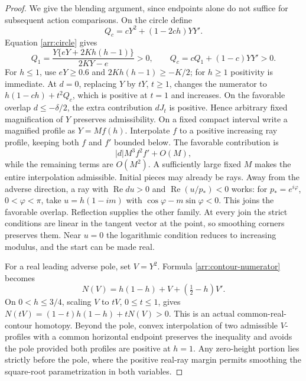 \begin{proof}
We give the blending argument, since endpoints alone do not suffice
for subsequent action comparisons.  On the circle define
\[
 Q_c=cY^2+(1-2ch)YY'.
\]
Equation \eqref{arr:circle} gives
\[
 Q_1=\frac{Y\{eY+2Kh(h-1)\}}{2KY-e}>0,\qquad
 Q_c=cQ_1+(1-c)YY'>0.
\]
For \(h\le1\), use \(eY\ge0.6\) and
\(2Kh(h-1)\ge-K/2\); for \(h\ge1\) positivity is immediate.
At \(d=0\), replacing \(Y\) by \(tY\), \(t\ge1\), changes the numerator
to \(h(1-ch)+t^2Q_c\), which is positive at \(t=1\) and increases.
On the favorable overlap \(d\le-\delta/2\), the extra contribution
\(dJ_t\) is positive.  Hence arbitrary fixed magnification of \(Y\)
preserves admissibility.
On a fixed compact interval write a magnified profile as \(Y=Mf(h)\).
Interpolate \(f\) to a positive increasing ray profile, keeping both
\(f\) and \(f'\) bounded below.  The favorable contribution is
\[
 |d|M^3f^2f'+O(M),
\]
while the remaining terms are \(O(M^2)\).  A sufficiently large
fixed \(M\) makes the entire interpolation admissible.  Initial
pieces may already be rays.  Away from the adverse direction, a ray
with \(\operatorname{Re}du>0\) and
\(\operatorname{Re}(u/p_*)<0\) works: for
\(p_*=e^{i\varphi}\), \(0<\varphi<\pi\), take
\(u=h(1-im)\) with \(\cos\varphi-m\sin\varphi<0\).
This joins the favorable overlap.  Reflection supplies the other
family.  At every join the strict conditions are linear in the
tangent vector at the point, so smoothing corners preserves them.
Near \(u=0\) the logarithmic condition reduces to increasing modulus,
and the start can be made real.

For a real leading adverse pole, set \(V=Y^2\).  Formula
\eqref{arr:contour-numerator} becomes
\begin{equation}\label{arr:affine-homotopy}
 N(V)=h(1-h)+V+(\tfrac12-h)V'.
\end{equation}
On \(0<h\le3/4\), scaling \(V\) to \(tV\), \(0\le t\le1\), gives
\(N(tV)=(1-t)h(1-h)+tN(V)>0\).
This is an actual common-real-contour homotopy.  Beyond the pole,
convex interpolation of two admissible \(V\)-profiles with a common
horizontal endpoint preserves the inequality and avoids the pole
provided both profiles are positive at \(h=1\).
Any zero-height portion lies strictly before the pole, where the
positive real-ray margin permits smoothing the square-root
parametrization in both variables.


\end{proof}
